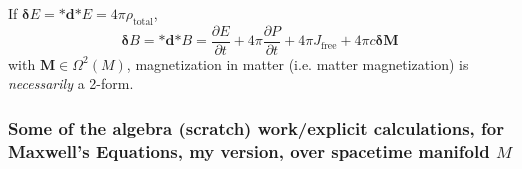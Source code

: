 \documentclass[10pt]{amsart}
\begin{document}
\begin{multicols*}{2}
If $\mathbf{\delta}E = \mathbf{*} \mathbf{d} \mathbf{*} E = 4\pi \rho_{\text{total}}$, 
\begin{equation}\label{Eq:MaxwellsEqnsDGEBFaraday}
	\boxed{ \mathbf{\delta} B = \mathbf{*} \mathbf{d} \mathbf{*} B = \frac{ \partial E}{ \partial t} + 4\pi \frac{ \partial P}{ \partial t} + 4\pi J_{\text{free}} + 4\pi c \mathbf{\delta} \mathbf{M} }
\end{equation}
with $\mathbf{M} \in \Omega^2(M)$, magnetization in matter (i.e. matter magnetization) is \emph{necessarily} a 2-form.  

\subsubsection{Some of the algebra (scratch) work/explicit calculations, for Maxwell's Equations, my version, over spacetime manifold $M$}


\end{multicols*}
\end{document}

